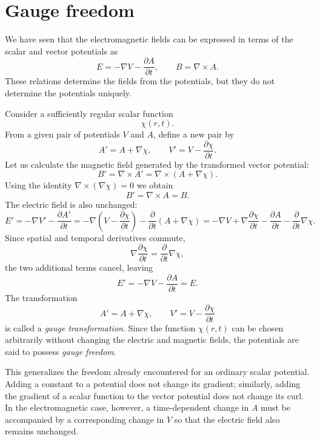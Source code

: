 \section{Gauge freedom}

We have seen that the electromagnetic fields can be expressed in terms of the
scalar and vector potentials as
\[
	E = - \nabla V - \frac{\partial A}{\partial t}, \qquad
	B = \nabla \times A.
\]
These relations determine the fields from the potentials, but they do not
determine the potentials uniquely.

Consider a sufficiently regular scalar function
\[
	\chi (r,t).
\]
From a given pair of potentials \(V\) and \(A\), define a new pair by
\[
	A' = A + \nabla \chi, \qquad V' = V -
	\frac{\partial \chi}{\partial t}.
\]
Let us calculate the magnetic field generated by the transformed vector
potential:
\[
	B' = \nabla \times A' = \nabla \times
	\left( A + \nabla \chi  \right).
\]
Using the identity \( \nabla \times (\nabla \chi) = 0\) we obtain
\[
	B' = \nabla \times A = B.
\]
The electric field is also unchanged:
\[
	E' = -\nabla V' - \frac{\partial A'}{\partial t} =
	-\nabla \left(V - \frac{\partial \chi}{\partial t} \right) -
	\frac{ \partial}{\partial t} \left(A + \nabla \chi \right) =
	- \nabla V + \nabla \frac{\partial \chi}{\partial t} -
	\frac{\partial A}{\partial t} - \frac{\partial}{\partial t} \nabla \chi.
\]
Since spatial and temporal derivatives commute,
\[
	\nabla \frac{\partial \chi}{\partial t} =
	\frac{\partial}{\partial t} \nabla \chi,
\]
the two additional terms cancel, leaving
\[
	E' = -\nabla V - \frac{\partial A}{\partial t} = E.
\]
The transformation
\[
	A' = A + \nabla \chi, \qquad V' = V - \frac{\partial \chi}{\partial t}
\]
is called a \emph{gauge transformation}. Since the function \(\chi(r,t)\)
can be chosen arbitrarily without changing the electric and magnetic fields,
the potentials are said to possess \emph{gauge freedom}.


This generalizes the freedom already encountered for an ordinary scalar
potential. Adding a constant to a potential does not change its gradient;
similarly, adding the gradient of a scalar function to the vector potential
does not change its curl. In the electromagnetic case, however, a
time-dependent change in \(A\) must be accompanied by a corresponding change
in \(V\) so that the electric field also remains unchanged.

